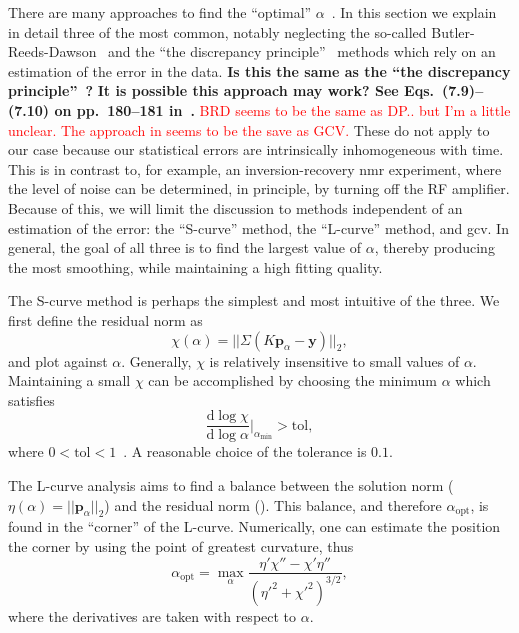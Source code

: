 There are many approaches to find the ``optimal'' $\alpha$~\cite{2001-Kilmer-SIAMJMAA-22-1204, 2011-Bauer-MCS-81-1795}. In this section we explain in detail three of the most common, notably neglecting the so-called Butler-Reeds-Dawson~\cite{1981-Butler-SIAMJNMA-18-381} and the ``the discrepancy principle''~\cite{1966-Morozon-DANSSR-167-510} methods which rely on an estimation of the error in the data. 
\textbf{Is this the same as the ``the discrepancy principle''~\cite{1966-Morozon-DANSSR-167-510}?}
\textbf{It is possible this approach may work? See Eqs.~(7.9)--(7.10) on pp.~180--181 in~\cite{1998-Hansen-RDDIPP}.}
\textcolor{red}{BRD seems to be the same as DP.. but I'm a little unclear. The approach in  seems to be the save as GCV.}
These do not apply to our case because our statistical errors are intrinsically inhomogeneous with time. This is in contrast to, for example, an inversion-recovery \gls{nmr} experiment, where the level of noise can be determined, in principle, by turning off the RF amplifier. Because of this, we will limit the discussion to methods independent of an  estimation of the error: the ``S-curve'' method, the ``L-curve'' method, and \gls{gcv}. In general, the goal of all three is to find the largest value of $\alpha$, thereby producing the most smoothing, while maintaining a high fitting quality. 

The S-curve method is perhaps the simplest and most intuitive of the three. We first define the residual norm as
%
\begin{equation} \label{eq:chi}
   \chi(\alpha) = || \Sigma \left ( K \mathbf{p}_\alpha - \mathbf{y} \right ) ||_2,
\end{equation}
%
and plot against $\alpha$. Generally, $\chi$ is relatively insensitive to small values of $\alpha$. Maintaining a small $\chi$ can be accomplished by choosing the minimum $\alpha$ which satisfies
%
\begin{equation}\label{eq:L-opt}
\frac{\mathrm{d}\log\chi}{\mathrm{d}\log\alpha}\Bigg|_{\alpha_\mathrm{min}} > \mathrm{tol},
\end{equation}
%
where $0<\mathrm{tol}<1$~\cite{Zou2016}. A reasonable choice of the tolerance is $0.1$.

The L-curve analysis aims to find a balance between the solution norm ($\eta(\alpha) = || \mathbf{p}_\alpha ||_2$) and the residual norm (). This balance, and therefore $\alpha_\mathrm{opt}$, is found in the ``corner'' of the L-curve. Numerically, one can estimate the position the corner by using the point of greatest curvature, thus
%
\begin{equation}
\alpha_\mathrm{opt} = \max_{\alpha} \frac{\eta'\chi'' - \chi'\eta''}{(\eta'^2+\chi'^2)^{3/2}},
\end{equation}
%
where the derivatives are taken with respect to $\alpha$.

